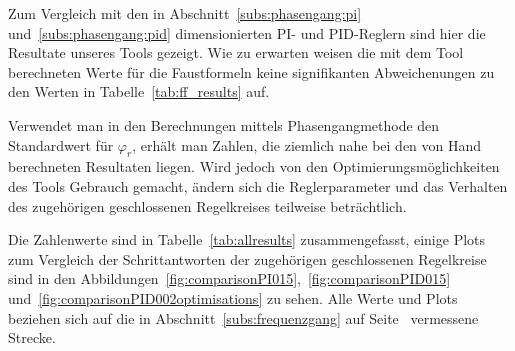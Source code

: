 Zum     Vergleich     mit    den     in     Abschnitt~\ref{subs:phasengang:pi}
und~\ref{subs:phasengang:pid}  dimensionierten PI-  und PID-Reglern  sind hier
die Resultate unseres  Tools gezeigt. Wie zu erwarten weisen die  mit dem Tool
berechneten Werte f\"ur die Faustformeln keine signifikanten Abweichenungen zu
den Werten in Tabelle~\ref{tab:ff_results} auf.

Verwendet man  in den Berechnungen mittels  Phasengangmethode den Standardwert
f\"ur $\varphi_r$,  erh\"alt man Zahlen,  die ziemlich  nahe bei den  von Hand
berechneten Resultaten liegen. Wird jedoch von den Optimierungsm\"oglichkeiten
des   Tools  Gebrauch   gemacht,   \"andern  sich   die  Reglerparameter   und
das   Verhalten  des   zugeh\"origen   geschlossenen  Regelkreises   teilweise
betr\"achtlich.

Die        Zahlenwerte       sind        in       Tabelle~\ref{tab:allresults}
zusammengefasst,       einige       Plots        zum       Vergleich       der
Schrittantworten    der   zugeh\"origen    geschlossenen   Regelkreise    sind
in    den    Abbildungen~\ref{fig:comparisonPI015},~\ref{fig:comparisonPID015}
und~\ref{fig:comparisonPID002optimisations}   zu   sehen.   Alle   Werte   und
Plots  beziehen   sich  auf   die  in   Abschnitt~\ref{subs:frequenzgang}  auf
Seite~\pageref{subs:frequenzgang} vermessene Strecke.

